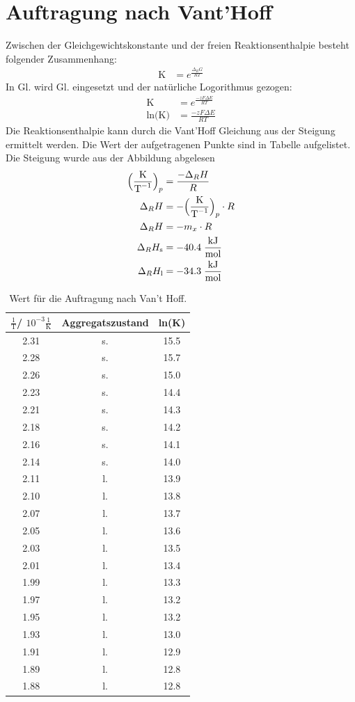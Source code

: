 \documentclass[12pt,a4paper,titlepage,headinclude,bibtotoc]{scrartcl}
\begin{document}
\section{Auftragung nach Vant'Hoff}
Zwischen der Gleichgewichtskonstante und der freien Reaktionsenthalpie besteht folgender Zusammenhang:
\begin{align}
\text{K}&=e^{\frac{\Delta_R G}{RT}}
\end{align}
In Gl. wird Gl. eingesetzt und der natürliche Logorithmus gezogen:
\begin{align}
\text{K}&=e^{\frac{-zF\Delta E}{RT}}\\
\text{ln(K)}&=\frac{-zF\Delta E}{RT}
\end{align}
Die Reaktionsenthalpie kann durch die Vant'Hoff Gleichung aus der Steigung ermittelt werden. Die Wert der aufgetragenen Punkte sind in Tabelle aufgelistet. Die Steigung wurde aus der Abbildung abgelesen
\begin{align}
\Bigl(\frac{\text{K}}{\text{T}^{-1}}\Bigr)_p&=\frac{-\Delta_R H}{R}\\
\Delta_R H&=- \Bigl(\frac{\text{K}}{\text{T}^{-1}}\Bigr)_p\cdot R\\
\Delta_R H&=- m_x\cdot R\\
\Delta_R H_{\text{s}}&=-40.4\;\frac{\text{kJ}}{\text{mol}}\\
\Delta_R H_{\text{l}}&=-34.3\;\frac{\text{kJ}}{\text{mol}}\\
\end{align}
\begin{table}[h]
\centering
\caption{Wert für die Auftragung nach Van't Hoff.}
\begin{tabular}{c|c|c}
$\frac{1}{\text{T}}$/ $10^{-3}\frac{1}{\text{K}}$ &Aggregatszustand& ln(K) \\
\hline
2.31 &  s. & 15.5\\
2.28 & s. & 15.7 \\
2.26 & s. &15.0\\
2.23 & s. &14.4\\
2.21 & s. &14.3\\
2.18 & s. &14.2\\
2.16 & s. &14.1\\
2.14 & s. &14.0\\
2.11 & l. &13.9\\
2.10 & l. &13.8\\
2.07 & l. &13.7\\
2.05  & l. &13.6\\
2.03 & l. &13.5\\
2.01 & l. &13.4\\
1.99 & l. &13.3\\
1.97 & l. &13.2\\
1.95 & l. &13.2\\
1.93 & l. &13.0\\
1.91 & l. &12.9\\
1.89 & l. &12.8\\
1.88 & l. &12.8\\
\end{tabular}
\end{table}
\end{document}
